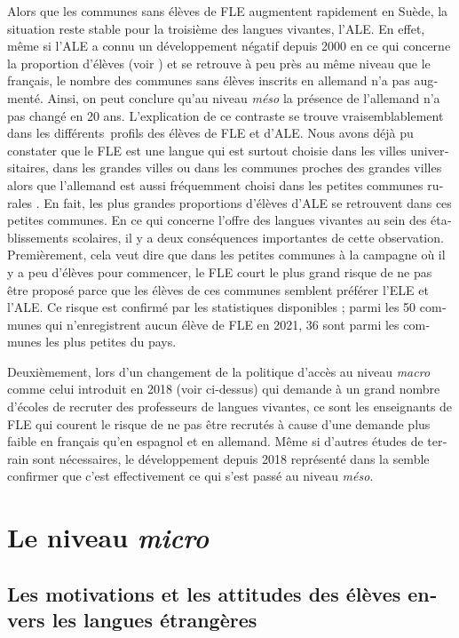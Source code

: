 \documentclass[french, output=paper]{langscibook}
\begin{document}
\begin{otherlanguage}{french}
Alors que les communes sans élèves de FLE augmentent rapidement en Suède, la situation reste stable pour la troisième des langues vivantes, l’ALE. En effet, même si l’ALE a connu un développement négatif depuis 2000 en ce qui concerne la proportion d’élèves (voir ) et se retrouve à peu près au même niveau que le français, le nombre des communes sans élèves inscrits en allemand n’a pas augmenté. Ainsi, on peut conclure qu’au niveau \textit{méso} la présence de l’allemand n’a pas changé en 20 ans. L’explication de ce contraste se trouve vraisemblablement dans les différents~profils des élèves de FLE et d’ALE. Nous avons déjà pu constater \citep{GranfeldtEtAl2021} que le FLE est une langue qui est surtout choisie dans les villes universitaires, dans les grandes villes ou dans les communes proches des grandes villes alors que l’allemand est aussi fréquemment choisi dans les petites communes rurales \citep{GranfeldtEtAl2021}. En fait, les plus grandes proportions d’élèves d’ALE se retrouvent dans ces petites communes. En ce qui concerne l’offre des langues vivantes au sein des établissements scolaires, il y a deux conséquences importantes de cette observation. Premièrement, cela veut dire que dans les petites communes à la campagne où il y a peu d’élèves pour commencer, le FLE court le plus grand risque de ne pas être proposé parce que les élèves de ces communes semblent préférer l’ELE et l’ALE. Ce risque est confirmé par les statistiques disponibles ; parmi les 50 communes qui n’enregistrent aucun élève de FLE en 2021, 36 sont parmi les communes les plus petites du pays. 

Deuxièmement, lors d’un changement de la politique d’accès au niveau \textit{macro} comme celui introduit en 2018 (voir ci-dessus) qui demande à un grand nombre d’écoles de recruter des professeurs de langues vivantes, ce sont les enseignants de FLE qui courent le risque de ne pas être recrutés à cause d’une demande plus faible en français qu’en espagnol et en allemand. Même si d’autres études de terrain sont nécessaires, le développement depuis 2018 représenté dans la  semble confirmer que c’est effectivement ce qui s’est passé au niveau \textit{méso}. 

\section{Le niveau \textit{micro}}\label{sec:granfeldt:5}

\subsection{Les motivations et les attitudes des élèves envers les langues étrangères}\label{sec:granfeldt:5.1}


\end{otherlanguage}
\end{document}
